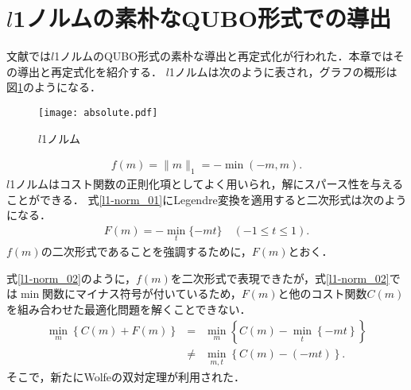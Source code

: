 \documentclass[technicalreport]{ieicej}
\begin{document}
\section{$l$1ノルムの素朴なQUBO形式での導出}
文献\cite{l1-norm}では$l$1ノルムのQUBO形式の素朴な導出と再定式化が行われた．本章ではその導出と再定式化を紹介する．
$l$1ノルムは次のように表され，グラフの概形は図\ref{fig:l1-norm}のようになる．
\begin{figure}[t]
  \begin{center}
    \vspace{-20mm}
    \texttt{[image: absolute.pdf]}
    \vspace{-20mm}
    \caption{$l$1ノルム}
    \label{fig:l1-norm}
  \end{center}
\end{figure}
\begin{eqnarray}
  f(m) = \|m\|_{1} = -\min{(-m,m)}. \label{l1-norm_01}
\end{eqnarray}
$l$1ノルムはコスト関数の正則化項としてよく用いられ，解にスパース性を与えることができる．
式\ref{l1-norm_01}にLegendre変換を適用すると二次形式は次のようになる．
\begin{eqnarray}
  F(m) = -\min_{t}{\{-mt\}} \quad (-1\leq t\leq 1). \label{l1-norm_02}
\end{eqnarray}
$f(m)$の二次形式であることを強調するために，$F(m)$とおく．

式\ref{l1-norm_02}のように，$f(m)$を二次形式で表現できたが，式\ref{l1-norm_02}では$\min$関数にマイナス符号が付いているため，$F(m)$と他のコスト関数$C(m)$を組み合わせた最適化問題を解くことできない．
\begin{eqnarray}
  \min_{m}{\left\{C(m)+F(m)\right\}} &=& \min_{m}{\left\{C(m)-\min_{t}{\left\{-mt\right\}}\right\}} \nonumber \\
  & \neq & \min_{m,t}{\left\{C(m)-(-mt)\right\}}.
\end{eqnarray}
そこで，新たにWolfeの双対定理が利用された．
\end{document}
